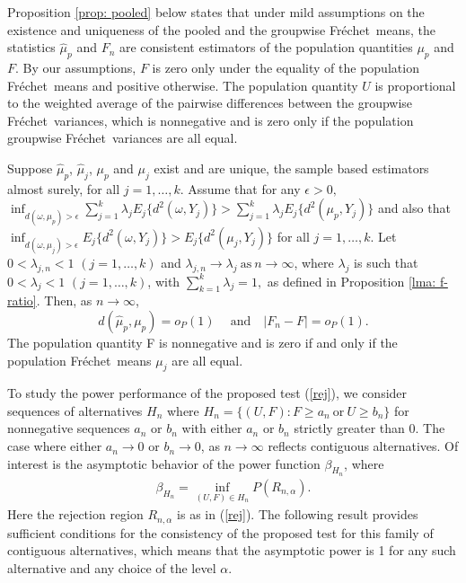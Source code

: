 \documentclass[lineno]{biometrika}
\newcommand{\be}{\begin{eqnarray}}
\newcommand{\ee}{\end{eqnarray}}
\newcommand{\la}{\label}
\def\F{Fr\'{e}chet}
\begin{document}
Proposition \ref{prop: pooled} below states that under mild assumptions on the existence and uniqueness of the pooled and the groupwise \F \ means, the statistics $\hat{\mu}_p$ and $F_n$ are  consistent estimators of the population quantities $\mu_p$ and $F$. By our assumptions, $F$ is zero only under the equality of the population \F \ means and positive otherwise. The population quantity $U$ is proportional to the weighted average of the pairwise differences between the groupwise \F \ variances, which is nonnegative and is zero only if the population groupwise \F \ variances are all equal. %
\begin{proposition}
	\label{prop: pooled}
	Suppose $\hat{\mu}_p$, $\hat{\mu}_j$, $\mu_p$ and $\mu_j$ exist and are unique, the sample based estimators almost surely,  for all $j=1,\ldots,k$. Assume that for any $\epsilon > 0,$ $\inf_{d(\omega,\mu_p)>\epsilon}  \sum_{j=1}^{k}
	\lambda_j E_j\{d^2(\omega,Y_j)\} > \sum_{j=1}^{k}
	\lambda_j E_j\{d^2(\mu_{p},Y_j)\}$ and also that  $\inf_{d(\omega,\mu_j)>\epsilon} E_j\{d^2(\omega,Y_j)\} > E_j\{d^2(\mu_j,Y_j)\}$ for all $j=1,\ldots,k$. Let $0  < \lambda_{j,n} < 1 \,\,  (j=1,\dots,k)$ and $\lambda_{j,n} \rightarrow \lambda_j  \ \text{as} \ n \rightarrow \infty$, where $\lambda_j$ is such that $0 < \lambda_j < 1 \,\, (j=1,\dots,k)$, with $\sum_{k=1}^k \lambda_j =1,$ as defined in Proposition \ref{lma: f-ratio}. Then, as $n \rightarrow \infty$,
	\begin{equation}
	d(\hat{\mu}_p , \mu_p)=o_P(1) \quad \ \text{and} \quad |F_n-F| =o_P(1).
	\end{equation}
	The population quantity F is nonnegative and is zero if and only if the population \F \ means $\mu_j$ are all equal. 
\end{proposition}

To study the power performance of the proposed  test (\ref{rej}), we consider sequences of alternatives $H_n$ where $H_n=\{(U,F): F \geq a_n \ \text{or} \  U \geq b_n\}$ for nonnegative sequences $a_n$ or $b_n$ with either $a_n$ or $b_n$ strictly greater than 0. The case where either $a_n \rightarrow 0$ or $b_n \rightarrow 0$, as $n \rightarrow \infty$ reflects contiguous alternatives. Of interest is the asymptotic behavior of the power function $\beta_{H_{n}}$, where
\be
\beta_{H_{n}}= \inf_{(U,F) \in H_n} P\left( R_{n,\alpha}\right).   \la{pow}     
\ee	
Here the rejection region $R_{n,\alpha}$ is as in (\ref{rej}). The 
following result   provides sufficient conditions for the consistency of the  proposed test for this family of contiguous alternatives, which means that the asymptotic power is 1 for any such alternative and  any choice of the level $\alpha$.  
\end{document}

